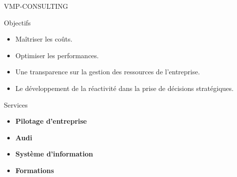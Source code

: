 \documentclass[french]{beamer}
\begin{document}
\begin{frame}{VMP-CONSULTING}
\transblindshorizontal<1>[duration=1]	


\begin{block}{Objectifs}
\begin{itemize}

\item Maîtriser les coûts.

\item Optimiser les performances.

\item Une transparence sur la gestion des ressources de  l'entreprise.

\item Le développement de la réactivité dans la prise de décisions stratégiques.
\end{itemize}

\end{block}
\pause
\begin{block}{Services}
\begin{itemize}

\item \textbf{Pilotage d'entreprise } 


\item \textbf{Audi }


\item \textbf{Système d'information } 

\item \textbf{Formations }
\end{itemize}

\end{block}



	
\end{frame}
\end{document}
